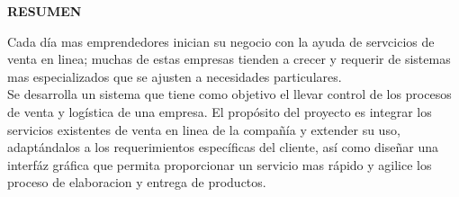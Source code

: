 
\begin{center}
  {\Large \bf{RESUMEN}}
\end{center}
Cada día mas emprendedores inician su negocio con la ayuda de servcicios de venta en linea; muchas de estas empresas 
tienden a crecer y requerir de sistemas mas especializados que se ajusten a necesidades particulares.\\[0.8cm]
Se desarrolla un sistema que tiene como objetivo el llevar control de los procesos de venta y logística de una empresa.
El propósito del proyecto es integrar los servicios existentes de venta en linea de la compañía
y extender su uso, adaptándalos a los requerimientos específicas del cliente, así como diseñar una interfáz gráfica que permita
proporcionar un servicio mas rápido y agilice los proceso de elaboracion y entrega de productos.